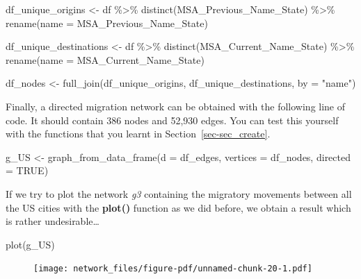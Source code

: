 \documentclass[
  letterpaper,
  DIV=11,
  numbers=noendperiod]{scrreprt}
\newenvironment{Shaded}{\begin{snugshade}}{\end{snugshade}}
\newcommand{\AttributeTok}[1]{\textcolor[rgb]{0.40,0.45,0.13}{#1}}
\newcommand{\ConstantTok}[1]{\textcolor[rgb]{0.56,0.35,0.01}{#1}}
\newcommand{\FunctionTok}[1]{\textcolor[rgb]{0.28,0.35,0.67}{#1}}
\newcommand{\NormalTok}[1]{\textcolor[rgb]{0.00,0.23,0.31}{#1}}
\newcommand{\OtherTok}[1]{\textcolor[rgb]{0.00,0.23,0.31}{#1}}
\newcommand{\SpecialCharTok}[1]{\textcolor[rgb]{0.37,0.37,0.37}{#1}}
\newcommand{\StringTok}[1]{\textcolor[rgb]{0.13,0.47,0.30}{#1}}
\begin{document}
\begin{Shaded}
\begin{Highlighting}[]
\NormalTok{df\_unique\_origins }\OtherTok{\textless{}{-}}\NormalTok{ df }\SpecialCharTok{\%\textgreater{}\%} 
  \FunctionTok{distinct}\NormalTok{(MSA\_Previous\_Name\_State) }\SpecialCharTok{\%\textgreater{}\%}
  \FunctionTok{rename}\NormalTok{(}\AttributeTok{name =}\NormalTok{ MSA\_Previous\_Name\_State) }

\NormalTok{df\_unique\_destinations }\OtherTok{\textless{}{-}}\NormalTok{ df }\SpecialCharTok{\%\textgreater{}\%}
  \FunctionTok{distinct}\NormalTok{(MSA\_Current\_Name\_State) }\SpecialCharTok{\%\textgreater{}\%}
  \FunctionTok{rename}\NormalTok{(}\AttributeTok{name =}\NormalTok{ MSA\_Current\_Name\_State)}

\NormalTok{df\_nodes }\OtherTok{\textless{}{-}} \FunctionTok{full\_join}\NormalTok{(df\_unique\_origins, df\_unique\_destinations, }\AttributeTok{by =} \StringTok{"name"}\NormalTok{)}
\end{Highlighting}
\end{Shaded}

Finally, a directed migration network can be obtained with the following
line of code. It should contain 386 nodes and 52,930 edges. You can test
this yourself with the functions that you learnt in
Section~\ref{sec-sec_create}.

\begin{Shaded}
\begin{Highlighting}[]
\NormalTok{g\_US }\OtherTok{\textless{}{-}} \FunctionTok{graph\_from\_data\_frame}\NormalTok{(}\AttributeTok{d =}\NormalTok{ df\_edges,}
                                       \AttributeTok{vertices =}\NormalTok{ df\_nodes,}
                                       \AttributeTok{directed =} \ConstantTok{TRUE}\NormalTok{)}
\end{Highlighting}
\end{Shaded}

If we try to plot the network \emph{g3} containing the migratory
movements between all the US cities with the \textbf{plot()} function as
we did before, we obtain a result which is rather undesirable\ldots{}

\begin{Shaded}
\begin{Highlighting}[]
\FunctionTok{plot}\NormalTok{(g\_US)}
\end{Highlighting}
\end{Shaded}

\begin{figure}[H]

{\centering \texttt{[image: network\_files/figure-pdf/unnamed-chunk-20-1.pdf]}

}

\end{figure}
\end{document}
